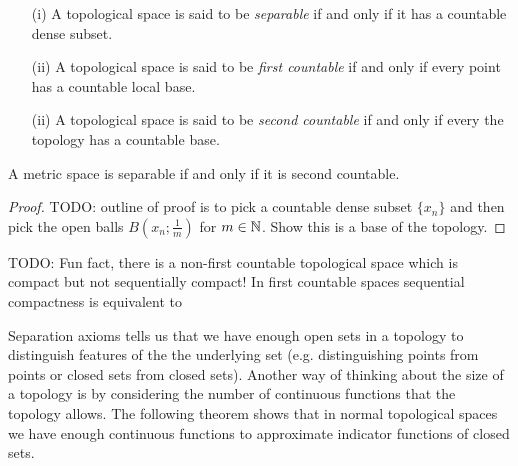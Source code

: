 \begin{defn}
\begin{itemize}
\item[(i)]A topological space is said to be \emph{separable} if and
  only if it has a countable dense subset.
\item[(ii)]A topological space is said to be \emph{first countable} if and
  only if every point has a countable local base.
\item[(ii)]A topological space is said to be \emph{second countable} if and
  only if every the topology has a countable base.
\end{itemize}
\end{defn}
\begin{lem}\label{SeparabilitySecondCountabilityMetricSpaces}A metric space is separable if and only if it is second countable.
\end{lem}
\begin{proof}
TODO:
outline of proof is to pick a countable dense subset $\lbrace x_n
\rbrace$ and then pick the open balls $B(x_n; \frac{1}{m})$ for $m \in
\mathbb{N}$.  Show this is a base of the topology.
\end{proof}

TODO:  Fun fact, there is a non-first countable topological space
which is compact but not sequentially compact!  In first countable
spaces sequential compactness is equivalent to 

Separation axioms tells us that we have enough open sets in a topology
to distinguish features of the the underlying set (e.g. distinguishing
points from points or closed sets from closed sets).  Another way of
thinking about the size of a topology is by considering the number of
continuous functions that the topology allows.  The following theorem
shows that in normal topological spaces we have enough continuous
functions to approximate indicator functions of closed sets.


